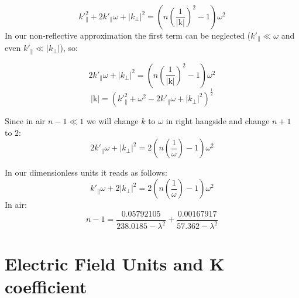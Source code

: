 \documentclass{article}
\newcommand{\ff}{\frac}
\begin{document}
\[ k'^2_\parallel + 2 k'_\parallel \omega + |k_\perp|^2 = \left(n\left(\ff{1}{|\mathrm{k}|}\right)^2-1\right) \omega^2 \]
In our non-reflective approximation the first term can be neglected ($k'_\parallel \ll \omega$ and even $k'_\parallel \ll |k_\perp|$), so:

\[ 2 k'_\parallel \omega + |k_\perp|^2 = \left(n\left(\ff{1}{|\mathrm{k}|}\right)^2-1\right) \omega^2 \]
\[ |\mathrm{k}| = \left(k'^2_\parallel + \omega^2 - 2 k'_\parallel \omega + |k_\perp|^2\right)^\ff{1}{2}\]

Since in air $n-1 \ll 1$ we will change $k$ to $\omega$ in right hangside and change $n+1$ to $2$:
\[ 2 k'_\parallel \omega + |k_\perp|^2 = 2\left(n\left(\ff{1}{\omega}\right)-1\right) \omega^2 \]

In our dimensionless units it reads as follows:
\[ k'_\parallel \omega + 2 |k_\perp|^2 = 2 \left(n\left(\ff{1}{\omega}\right)-1\right) \omega^2 \]
In air:
\[ n-1=\ff{0.05792105}{238.0185-\lambda^2}+\ff{0.00167917}{57.362-\lambda^2} \]

\section{Electric Field Units and K coefficient}
\end{document}
